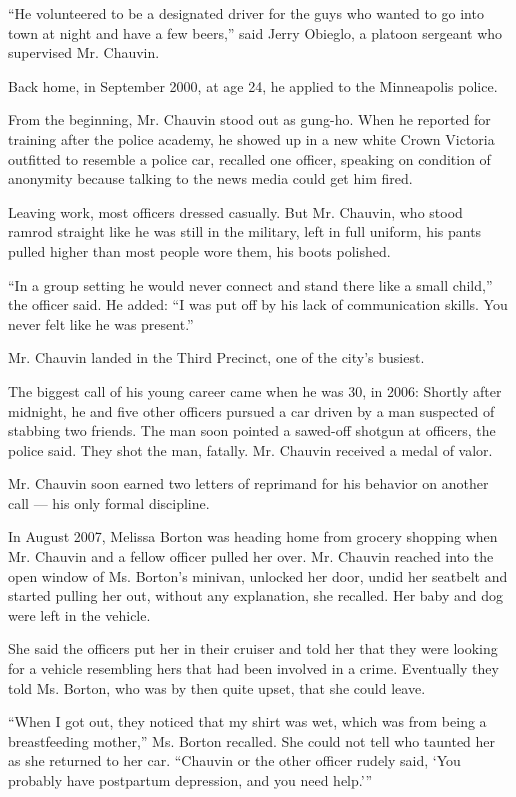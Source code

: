 ``He volunteered to be a designated driver for the guys who wanted to go
into town at night and have a few beers,'' said Jerry Obieglo, a platoon
sergeant who supervised Mr. Chauvin.

Back home, in September 2000, at age 24, he applied to the Minneapolis
police.

From the beginning, Mr. Chauvin stood out as gung-ho. When he reported
for training after the police academy, he showed up in a new white Crown
Victoria outfitted to resemble a police car, recalled one officer,
speaking on condition of anonymity because talking to the news media
could get him fired.

Leaving work, most officers dressed casually. But Mr. Chauvin, who stood
ramrod straight like he was still in the military, left in full uniform,
his pants pulled higher than most people wore them, his boots polished.

``In a group setting he would never connect and stand there like a small
child,'' the officer said. He added: ``I was put off by his lack of
communication skills. You never felt like he was present.''

Mr. Chauvin landed in the Third Precinct, one of the city's busiest.

The biggest call of his young career came when he was 30, in 2006:
Shortly after midnight, he and five other officers pursued a car driven
by a man suspected of stabbing two friends. The man soon pointed a
sawed-off shotgun at officers, the police said. They shot the man,
fatally. Mr. Chauvin received a medal of valor.

Mr. Chauvin soon earned two letters of reprimand for his behavior on
another call --- his only formal discipline.

In August 2007, Melissa Borton was heading home from grocery shopping
when Mr. Chauvin and a fellow officer pulled her over. Mr. Chauvin
reached into the open window of Ms. Borton's minivan, unlocked her door,
undid her seatbelt and started pulling her out, without any explanation,
she recalled. Her baby and dog were left in the vehicle.

She said the officers put her in their cruiser and told her that they
were looking for a vehicle resembling hers that had been involved in a
crime. Eventually they told Ms. Borton, who was by then quite upset,
that she could leave.

``When I got out, they noticed that my shirt was wet, which was from
being a breastfeeding mother,'' Ms. Borton recalled. She could not tell
who taunted her as she returned to her car. ``Chauvin or the other
officer rudely said, `You probably have postpartum depression, and you
need help.'''

